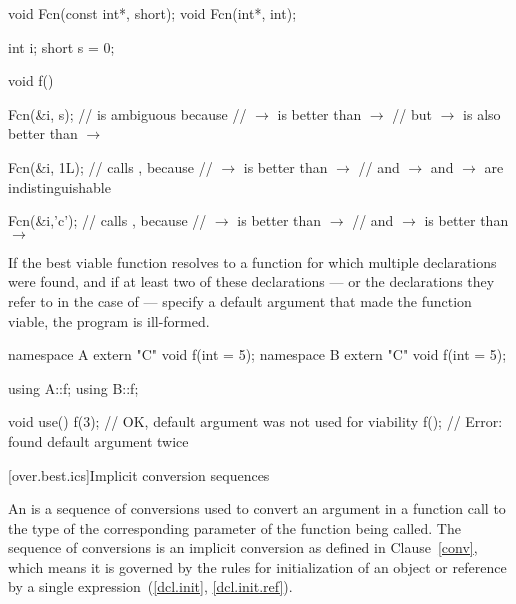 \enterexample

\begin{codeblock}
void Fcn(const int*,  short);
void Fcn(int*, int);

int i;
short s = 0;

void f() {
  Fcn(&i, s);                   // is ambiguous because
                                //  $\to$  is better than  $\to$ 
                                // but  $\to$  is also better than  $\to$ 

  Fcn(&i, 1L);                  // calls , because
                                //  $\to$  is better than  $\to$ 
                                // and  $\to$  and  $\to$  are indistinguishable

  Fcn(&i,'c');                  // calls , because
                                //  $\to$  is better than  $\to$ 
                                // and  $\to$  is better than  $\to$ 
}
\end{codeblock}
\exitexample

\pnum
If the best viable function resolves to a function for
which multiple declarations were found, and if at least
two of these declarations --- or the declarations they
refer to in the case of
--- specify a default argument that made the function
viable, the program is ill-formed.
\enterexample

\begin{codeblock}
namespace A {
  extern "C" void f(int = 5);
}
namespace B {
  extern "C" void f(int = 5);
}

using A::f;
using B::f;

void use() {
  f(3);                         // OK, default argument was not used for viability
  f();                          // Error: found default argument twice
}
\end{codeblock}
\exitexample

[over.best.ics]{Implicit conversion sequences}%

\pnum
An
%
is a sequence of conversions used
to convert an argument in a function call to the type of the
corresponding parameter of the function being called.
The
sequence of conversions is an implicit conversion as defined in
Clause~\ref{conv}, which means it is governed by the rules for
initialization of an object or reference by a single
expression~(\ref{dcl.init}, \ref{dcl.init.ref}).

